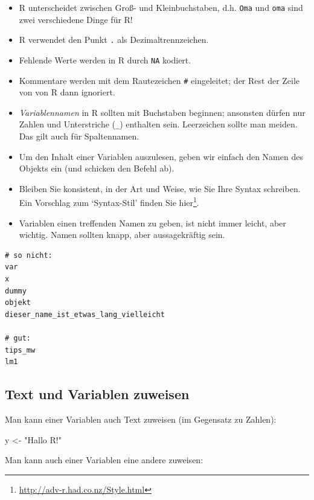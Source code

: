 \documentclass[12pt,ngerman,]{book}
\makeatletter
\newenvironment{Shaded}{\begin{snugshade}}{\end{snugshade}}
\newcommand{\StringTok}[1]{\textcolor[rgb]{0.31,0.60,0.02}{#1}}
\newcommand{\NormalTok}[1]{#1}
\providecommand{\tightlist}{%
  \setlength{\itemsep}{0pt}\setlength{\parskip}{0pt}}
\let\rmarkdownfootnote\footnote%
\def\footnote{\protect\rmarkdownfootnote}
\renewcommand{\href}[2]{#2\footnote{\url{#1}}}
\newenvironment{kframe}{%
\medskip{}
\setlength{\fboxsep}{.8em}
 \def\at@end@of@kframe{}%
 \ifinner\ifhmode%
  \def\at@end@of@kframe{\end{minipage}}%
  \begin{minipage}{\columnwidth}%
 \fi\fi%
 \def\FrameCommand##1{\hskip\@totalleftmargin \hskip-\fboxsep
 \colorbox{shadecolor}{##1}\hskip-\fboxsep
     \hskip-\linewidth \hskip-\@totalleftmargin \hskip\columnwidth}%
 \MakeFramed {\advance\hsize-\width
   \@totalleftmargin\z@ \linewidth\hsize
   \@setminipage}}%
 {\par\unskip\endMakeFramed%
 \at@end@of@kframe}
\renewenvironment{Shaded}{\begin{kframe}}{\end{kframe}}
\theoremstyle{definition}
\theoremstyle{definition}
\theoremstyle{remark}
\makeatother
\begin{document}
\begin{itemize}
\tightlist
\item
  R unterscheidet zwischen Groß- und Kleinbuchstaben, d.h. \texttt{Oma}
  und \texttt{oma} sind zwei verschiedene Dinge für R!
\item
  R verwendet den Punkt \texttt{.} als Dezimaltrennzeichen.
\item
  Fehlende Werte werden in R durch \texttt{NA} kodiert.
\item
  Kommentare werden mit dem Rautezeichen \texttt{\#} eingeleitet; der
  Rest der Zeile von von R dann ignoriert.
\item
  \emph{Variablennamen} in R sollten mit Buchstaben
  beginnen; ansonsten dürfen nur Zahlen und Unterstriche (\texttt{\_})
  enthalten sein. Leerzeichen sollte man meiden. Das gilt auch für
  Spaltennamen.
\item
  Um den Inhalt einer Variablen auszulesen, geben wir einfach den Namen
  des Objekts ein (und schicken den Befehl ab).
\item
  Bleiben Sie konsistent, in der Art und Weise, wie Sie Ihre Syntax
  schreiben. Ein Vorschlag zum `Syntax-Stil' finden Sie
  \href{http://adv-r.had.co.nz/Style.html}{hier}.
\item
  Variablen einen treffenden Namen zu geben, ist nicht immer leicht,
  aber wichtig. Namen sollten knapp, aber aussagekräftig sein.
\end{itemize}

\begin{verbatim}
# so nicht:
var
x
dummy
objekt
dieser_name_ist_etwas_lang_vielleicht

# gut:
tips_mw
lm1
\end{verbatim}

\subsection{Text und Variablen
zuweisen}\label{text-und-variablen-zuweisen}

Man kann einer Variablen auch Text zuweisen (im Gegensatz zu Zahlen):

\begin{Shaded}
\begin{Highlighting}[]
\NormalTok{y <-}\StringTok{ "Hallo R!"}
\end{Highlighting}
\end{Shaded}

Man kann auch einer Variablen eine andere zuweisen:
\end{document}
